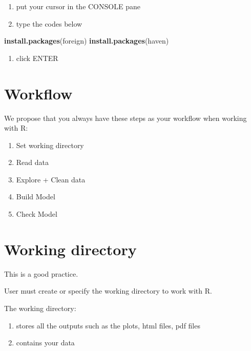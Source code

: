 \documentclass[]{book}
\newenvironment{Shaded}{\begin{snugshade}}{\end{snugshade}}
\newcommand{\KeywordTok}[1]{\textcolor[rgb]{0.13,0.29,0.53}{\textbf{#1}}}
\newcommand{\NormalTok}[1]{#1}
\providecommand{\tightlist}{%
  \setlength{\itemsep}{0pt}\setlength{\parskip}{0pt}}
\theoremstyle{definition}
\theoremstyle{definition}
\theoremstyle{remark}
\begin{document}
\begin{enumerate}
\def\labelenumi{\arabic{enumi}.}
\tightlist
\item
  put your cursor in the CONSOLE pane
\item
  type the codes below
\end{enumerate}

\begin{Shaded}
\begin{Highlighting}[]
\KeywordTok{install.packages}\NormalTok{(foreign)}
\KeywordTok{install.packages}\NormalTok{(haven)}
\end{Highlighting}
\end{Shaded}

\begin{enumerate}
\def\labelenumi{\arabic{enumi}.}
\setcounter{enumi}{2}
\tightlist
\item
  click ENTER
\end{enumerate}

\section{Workflow}\label{workflow}

We propose that you always have these steps as your workflow when
working with R:

\begin{enumerate}
\def\labelenumi{\arabic{enumi}.}
\tightlist
\item
  Set working directory
\item
  Read data
\item
  Explore + Clean data
\item
  Build Model
\item
  Check Model
\end{enumerate}

\section{Working directory}\label{working-directory}

This is a good practice.

User must create or specify the working directory to work with R.

The working directory:

\begin{enumerate}
\def\labelenumi{\arabic{enumi}.}
\tightlist
\item
  stores all the outputs such as the plots, html files, pdf files
\item
  contains your data
\end{enumerate}
\end{document}
